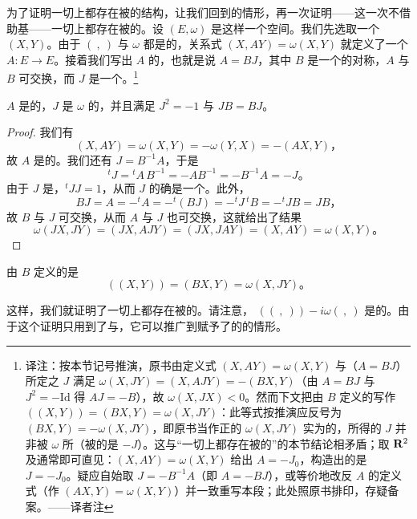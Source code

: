 为了证明一切\trSymplectic{}\trManifold{}上都存在被\trCalibrated{}的\trAlmostComplex{}结构，让我们回到\trVectorSpace{}的情形，再一次证明——这一次不借助基——一切\trSymplectic{}\trVectorSpace{}上都存在被\trCalibrated{}的\trComplexStructure。设 $(E,\omega)$ 是这样一个空间。我们先选取一个\trInnerProduct{} $(X,Y)$。由于 $(\ ,\ )$ 与 $\omega$ 都是\trNondegenerate{}的，关系式 $(X,AY)=\omega(X,Y)$ 就定义了一个\trIsomorphism{} $A\colon E\to E$。接着我们写出 $A$ 的\trPolarDecomposition，也就是说 $A=BJ$，其中 $B$ 是一个\trPositiveDefinite{}的对称\trEndomorphism，$A$ 与 $B$ 可交换，而 $J$ 是一个\trIsometry。\footnote{译注：按本节记号推演，原书由定义式 $(X,AY)=\omega(X,Y)$ 与\trPolarDecomposition{}（$A=BJ$）所定之 $J$ 满足 $\omega(X,JY)=(X,AJY)=-(BX,Y)$（由 $A=BJ$ 与 $J^2=-\mathrm{Id}$ 得 $AJ=-B$），故 $\omega(X,JX)<0$。然而下文把由 $B$ 定义的\trInnerProduct{}写作 $((X,Y))=(BX,Y)=\omega(X,JY)$：此等式按推演应反号为 $(BX,Y)=-\omega(X,JY)$，即原书当作正\trInnerProduct{}的 $\omega(X,JY)$ 实为\trNegativeDefinite{}的，所得的 $J$ 并非被 $\omega$ 所\trCalibrated{}（被\trCalibrated{}的是 $-J$）。这与“一切\trSymplectic{}\trVectorSpace{}上都存在被\trCalibrated{}的\trComplexStructure{}”的本节结论相矛盾；取 $\mathbf{R}^2$ 及通常\trInnerProduct{}即可直见：$(X,AY)=\omega(X,Y)$ 给出 $A=-J_0$，构造出的是 $J=-J_0$。疑应自始取 $J=-B^{-1}A$（即 $A=-BJ$），或等价地改反 $A$ 的定义式（作 $(AX,Y)=\omega(X,Y)$）并一致重写本段；此处照原书排印，存疑备案。——译者注}

\begin{lemma}\label{thm:polar-decomposition-lemma}
\trEndomorphism{} $A$ 是\trAntisymmetric{}的，$J$ 是 $\omega$ 的\trIsometry，并且满足 $J^2=-1$ 与 $JB=BJ$。
\end{lemma}

\begin{proof}
我们有
\[
(X,AY)=\omega(X,Y)=-\omega(Y,X)=-(AX,Y)\text{，}
\]
故 $A$ 是\trAntisymmetric{}的。我们还有 $J=B^{-1}A$，于是
\[
{}^tJ={}^tA\,B^{-1}=-AB^{-1}=-B^{-1}A=-J\text{。}
\]
由于 $J$ 是\trIsometry，${}^tJJ=1$，从而 $J$ 的确是一个\trComplexStructure。此外，
\[
BJ=A=-{}^tA=-{}^t(BJ)=-{}^tJ\,{}^tB=-{}^tJB=JB\text{，}
\]
故 $B$ 与 $J$ 可交换，从而 $A$ 与 $J$ 也可交换，这就给出了结果
\[
\omega(JX,JY)=(JX,AJY)=(JX,JAY)=(X,AY)=\omega(X,Y)\text{。}
\]
\end{proof}

由 $B$ 定义的\trInnerProduct{}是
\[
((X,Y))=(BX,Y)=\omega(X,JY)\text{。}
\]

这样，我们就证明了一切\trSymplectic{}\trVectorSpace{}上都存在被\trCalibrated{}的\trComplexStructure。请注意，\trForm{} $((\ ,\ ))-i\omega(\ ,\ )$ 是\trHermitian{}的。由于这个证明只用到了\trSymplecticForm{}与\trInnerProduct，它可以推广到赋予了\trRiemann\trMetric{}的\trSymplectic{}\trManifold{}的情形。

